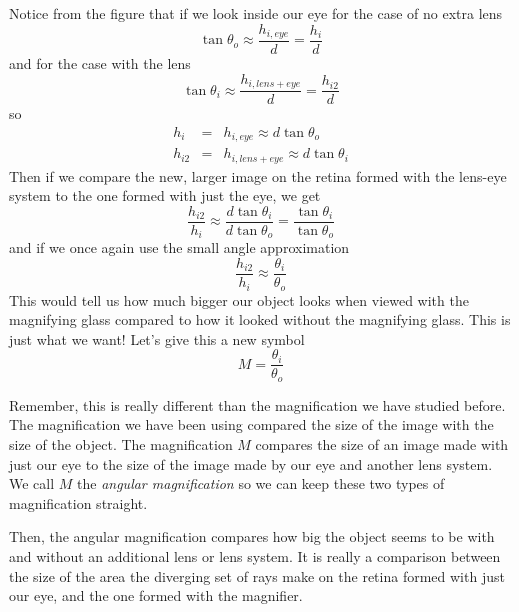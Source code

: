 \documentclass{article}
\begin{document}
Notice from the figure that if we look inside our eye for the case of no
extra lens 
\[
\tan \theta _{o}\approx \frac{h_{i,eye}}{d}=\frac{h_{i}}{d}
\]%
and for the case with the lens%
\[
\tan \theta _{i}\approx \frac{h_{i,lens+eye}}{d}=\frac{h_{i2}}{d}
\]%
so 
\begin{eqnarray*}
h_{i} &=&h_{i,eye}\approx d\tan \theta _{o} \\
h_{i2} &=&h_{i,lens+eye}\approx d\tan \theta _{i}
\end{eqnarray*}%
Then if we compare the new, larger image on the retina formed with the
lens-eye system to the one formed with just the eye, we get 
\[
\frac{h_{i2}}{h_{i}}\approx \frac{d\tan \theta _{i}}{d\tan \theta _{o}}=%
\frac{\tan \theta _{i}}{\tan \theta _{o}}
\]%
and if we once again use the small angle approximation 
\[
\frac{h_{i2}}{h_{i}}\approx \frac{\theta _{i}}{\theta _{o}}
\]%
This would tell us how much bigger our object looks when viewed with the
magnifying glass compared to how it looked without the magnifying glass.
This is just what we want! Let's give this a new symbol 
\begin{equation}
M=\frac{\theta _{i}}{\theta _{o}}
\end{equation}

Remember, this is really different than the magnification we have studied
before. The magnification we have been using compared the size of the image
with the size of the object. The magnification $M$ compares the size of an
image made with just our eye to the size of the image made by our eye and
another lens system. We call $M$ the \emph{angular magnification} so we can
keep these two types of magnification straight.

Then, the angular magnification compares how big the object seems to be with
and without an additional lens or lens system. It is really a comparison
between the size of the area the diverging set of rays make on the retina
formed with just our eye, and the one formed with the magnifier.
\end{document}
